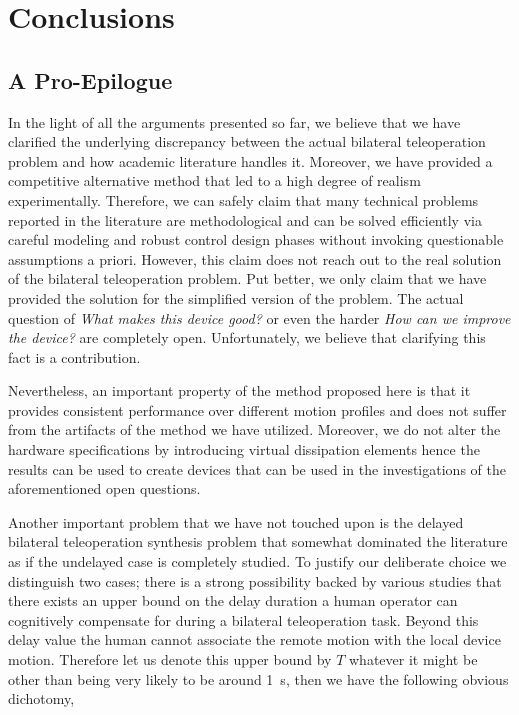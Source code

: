 \chapter{Conclusions}
\label{chap:conc}
\section{A Pro-Epilogue}
In the light of all the arguments presented so far, we believe that we have clarified the underlying discrepancy between the actual bilateral 
teleoperation problem and how academic literature handles it. Moreover, we have provided a competitive alternative method that led to a high
degree of realism experimentally. Therefore, we can safely claim that many technical problems reported in the literature are methodological and 
can be solved efficiently via careful modeling and robust control design phases without invoking questionable assumptions a priori. 
However, this claim does not reach out to the real solution of the bilateral teleoperation problem. Put better, we only claim that we have provided
the solution for the simplified version of the problem. The actual question of \emph{What makes this device good?} or even the harder 
\emph{How can we improve the device?} are completely open. Unfortunately, we believe that clarifying this fact is a contribution.

Nevertheless, an important property of the method proposed here is that it provides consistent performance over different motion profiles and 
does not suffer from the artifacts of the method we have utilized. Moreover, we do not alter the hardware specifications by introducing 
virtual dissipation elements hence the results can be used to create devices that can be used in the investigations of the aforementioned 
open questions.  

Another important problem that we have not touched upon is the delayed bilateral teleoperation synthesis problem that somewhat dominated the
literature as if the undelayed case is completely studied. To justify our deliberate choice we distinguish two cases; there is a strong 
possibility backed by various studies that there exists an upper bound on the delay duration a human operator can cognitively compensate for 
during a bilateral teleoperation task. Beyond this delay value the human cannot associate the remote motion with the local device motion. 
Therefore let us denote this upper bound by $T$ whatever it might be other than being very likely to be around \SI{1}{\second}, then we 
have the following obvious dichotomy,

